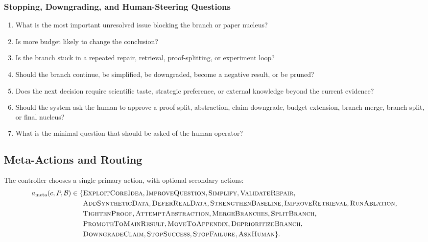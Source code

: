 \documentclass[11pt]{article}
\begin{document}
\subsubsection*{Stopping, Downgrading, and Human-Steering Questions}
\begin{enumerate}[leftmargin=*]
    \item What is the most important unresolved issue blocking the branch or paper nucleus?
    \item Is more budget likely to change the conclusion?
    \item Is the branch stuck in a repeated repair, retrieval, proof-splitting, or experiment loop?
    \item Should the branch continue, be simplified, be downgraded, become a negative result, or be pruned?
    \item Does the next decision require scientific taste, strategic preference, or external knowledge beyond the current evidence?
    \item Should the system ask the human to approve a proof split, abstraction, claim downgrade, budget extension, branch merge, branch split, or final nucleus?
    \item What is the minimal question that should be asked of the human operator?
\end{enumerate}

\subsection{Meta-Actions and Routing}

The controller chooses a single primary action, with optional secondary actions:
$$
\begin{aligned}
a_{\mathrm{meta}}(c,P,\mathcal{B})\in\{&\textsc{ExploitCoreIdea},\textsc{ImproveQuestion},\textsc{Simplify},\textsc{ValidateRepair},\\
&\textsc{AddSyntheticData},\textsc{DeferRealData},\textsc{StrengthenBaseline},\textsc{ImproveRetrieval},\textsc{RunAblation},\\
&\textsc{TightenProof},\textsc{AttemptAbstraction},\textsc{MergeBranches},\textsc{SplitBranch},\\
&\textsc{PromoteToMainResult},\textsc{MoveToAppendix},\textsc{DeprioritizeBranch},\\
&\textsc{DowngradeClaim},\textsc{StopSuccess},\textsc{StopFailure},\textsc{AskHuman}\}.
\end{aligned}
$$
\end{document}
